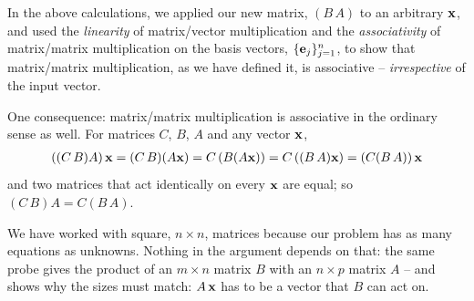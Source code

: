 \documentclass{article}
\begin{document}
In the above calculations, we applied our new matrix, $(B \, A)$ to an arbitrary ${\bf x}$, and 
used the {\em linearity\/} of matrix/vector multiplication and the {\em associativity\/}
of matrix/matrix multiplication on the basis vectors, $\{{\bf e}_j\}_{j=1}^n$, to show that matrix/matrix
multiplication, as we have defined it, is associative -- {\em irrespective\/} of the input vector.

One consequence: matrix/matrix multiplication is associative in the ordinary
sense as well. For matrices $C$, $B$, $A$ and any vector ${\bf x}$,
\begin{align}
	\left((C \, B) A\right) {\bf x} = (C \, B)(A {\bf x}) = C\left(B (A {\bf x})\right)
	= C\left((B \, A) {\bf x}\right) = \left(C (B \, A)\right) {\bf x}
\end{align}
and two matrices that act identically on every ${\bf x}$ are equal; so
$(C \, B) A = C (B \, A)$.

We have worked with square, $n \times n$, matrices because our problem has as
many equations as unknowns. Nothing in the argument depends on that: the same
probe gives the product of an $m \times n$ matrix $B$ with an $n \times p$
matrix $A$ -- and shows why the sizes must match: $A \, {\bf x}$ has to be a
vector that $B$ can act on.
\end{document}

